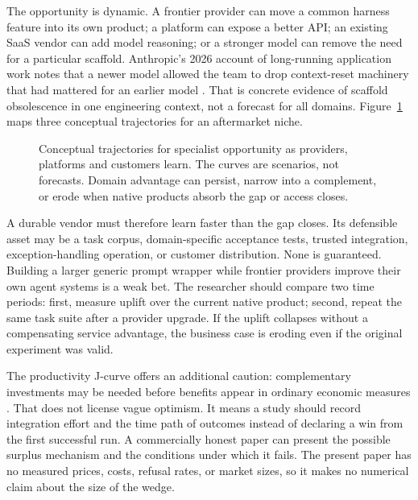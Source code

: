 The opportunity is dynamic. A frontier provider can move a common harness feature into its own product; a platform can expose a better API; an existing SaaS vendor can add model reasoning; or a stronger model can remove the need for a particular scaffold. Anthropic's 2026 account of long-running application work notes that a newer model allowed the team to drop context-reset machinery that had mattered for an earlier model \citep{anthropic2026}. That is concrete evidence of scaffold obsolescence in one engineering context, not a forecast for all domains. Figure~\ref{fig:durability} maps three conceptual trajectories for an aftermarket niche.

\begin{figure}[tbp]
\centering
\caption{Conceptual trajectories for specialist opportunity as providers, platforms and customers learn. The curves are scenarios, not forecasts. Domain advantage can persist, narrow into a complement, or erode when native products absorb the gap or access closes.}
\label{fig:durability}
\end{figure}

A durable vendor must therefore learn faster than the gap closes. Its defensible asset may be a task corpus, domain-specific acceptance tests, trusted integration, exception-handling operation, or customer distribution. None is guaranteed. Building a larger generic prompt wrapper while frontier providers improve their own agent systems is a weak bet. The researcher should compare two time periods: first, measure uplift over the current native product; second, repeat the same task suite after a provider upgrade. If the uplift collapses without a compensating service advantage, the business case is eroding even if the original experiment was valid.

The productivity J-curve offers an additional caution: complementary investments may be needed before benefits appear in ordinary economic measures \citep{jcurve}. That does not license vague optimism. It means a study should record integration effort and the time path of outcomes instead of declaring a win from the first successful run. A commercially honest paper can present the possible surplus mechanism and the conditions under which it fails. The present paper has no measured prices, costs, refusal rates, or market sizes, so it makes no numerical claim about the size of the wedge.
